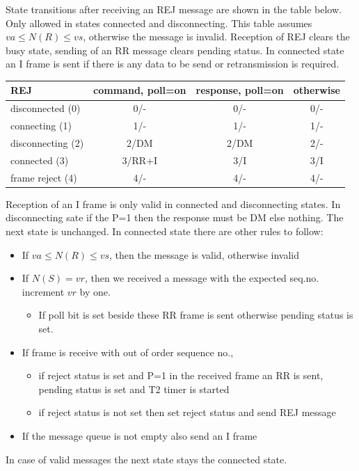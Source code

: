 \documentclass[a4paper]{article}
\begin{document}
State transitions after receiving an REJ message are shown in the table below. Only allowed in states connected and
disconnecting. This table assumes $va \leq N(R) \leq vs$, otherwise the message is invalid. Reception of REJ clears the
busy state, sending of an RR message clears pending status. In connected state an I frame is sent if there is any data
to be send or retransmission is required.

{\footnotesize
\begin{center}
    \begin{tabular}{|l|c|c|c|}
        \hline
        REJ               & command, poll=on & response, poll=on & otherwise  \\
        \hline
        disconnected (0)  & 0/-              & 0/-               & 0/-        \\
        \hline
        connecting (1)    & 1/-              & 1/-               & 1/-        \\
        \hline
        disconnecting (2) & 2/DM             & 2/DM              & 2/-        \\
        \hline
        connected (3)     & 3/RR+I           & 3/I               & 3/I        \\
        \hline
        frame reject (4)  & 4/-              & 4/-               & 4/-        \\
        \hline
    \end{tabular}
\end{center}
}

Reception of an I frame is only valid in connected and disconnecting states. In disconnecting sate if the P=1 then the
response must be DM else nothing. The next state is unchanged. In connected state there are other rules to follow:

\begin{itemize}
    \item If $va \leq N(R) \leq vs$, then the message is valid, otherwise invalid
    \item If $N(S) = vr$, then we received a message with the expected seq.no. increment $vr$ by one.
          \begin{itemize}
              \item  If poll bit is set beside these RR frame is sent otherwise pending status is set.
          \end{itemize}
    \item If frame is receive with out of order sequence no.,
          \begin{itemize}
              \item if reject status is set and P=1 in the received frame an RR is sent, pending status is set and T2 timer is
                    started
              \item if reject status is not set then set reject status and send REJ message
          \end{itemize}
    \item If the message queue is not empty also send an I frame
\end{itemize}
In case of valid messages the next state stays the connected state.
\end{document}
